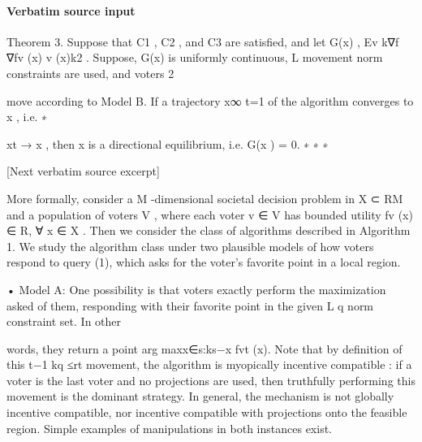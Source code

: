 \documentclass[10pt]{article}
\begin{document}
\paragraph{Verbatim source input}
\begin{ReviewVerbatim}
Theorem 3. Suppose that C1 , C2 , and C3 are satisfied, and let G(x) , Ev k∇f       ∇fv (x)
                                                                                     v (x)k2
                                                                                             .
Suppose, G(x) is uniformly continuous, L movement norm constraints are used, and voters
                                          2

move according to Model B. If a trajectory {x}∞    t=1 of the algorithm converges to x , i.e.
                                                                                       ∗

xt → x , then x is a directional equilibrium, i.e. G(x ) = 0.
      ∗        ∗                                       ∗

[Next verbatim source excerpt]

   More formally, consider a M -dimensional societal decision problem in X  ⊂ RM and a
population of voters V , where each voter v ∈ V has bounded utility fv (x) ∈ R, ∀ x ∈ X .
Then we consider the class of algorithms described in Algorithm 1. We study the algorithm
class under two plausible models of how voters respond to query (1), which asks for the
voter's favorite point in a local region.



• Model A:       One possibility is that voters exactly perform the maximization asked of
  them, responding with their favorite point in the given L
                                                                       q norm constraint set. In other

  words, they return a point arg maxx∈{s:ks−x                    fvt (x). Note that by definition of this
                                                  t−1 kq ≤rt }
  movement, the algorithm is     myopically incentive compatible : if a voter is the last voter
  and no projections are used, then truthfully performing this movement is the dominant
  strategy.   In general, the mechanism is not globally incentive compatible, nor incentive
  compatible with projections onto the feasible region. Simple examples of manipulations
  in both instances exist.




\end{ReviewVerbatim}
\end{document}
